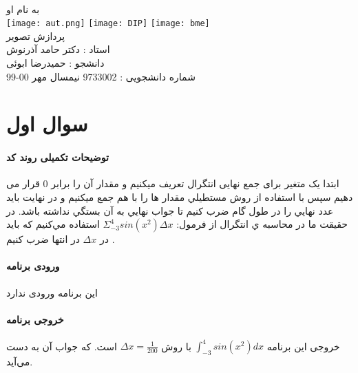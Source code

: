 \documentclass[12pt]{article}
\begin{document}
	\doublespacing
	\begin{titlepage}
		\paragraph*{}
		\centering
			
			
			{\small به نام او}\\
			\vspace{1cm}
			\texttt{[image: aut.png]}
			\hspace{1cm}
			\texttt{[image: DIP]}
			\hspace{1cm}
			\texttt{[image: bme]}\\
			\vspace{2cm}
			{\Huge پردازش تصویر}\\
			\vspace{2cm}
			{\large استاد : دکتر حامد آذرنوش}\\
			\vspace{0.5cm}
			{\small  دانشجو :‌ حمیدرضا ابوئی}\\
			\vspace{0.5cm}
			{\small شماره دانشجویی : 9733002}
			\vfill
			{\tiny نیمسال مهر 00-99}
	\end{titlepage}
	\thispagestyle{plain}
	\tableofcontents
	\newpage
	\doublespacing
	\section{سوال اول}
		\paragraph{توضیحات تکمیلی روند کد}
			ابتدا یک متغیر برای جمع نهایی انتگرال تعریف میکنیم و مقدار آن را برابر $0$ قرار می دهیم سپس با استفاده از روش مستطيلي مقدار ها را با هم جمع ميكنيم و در نهايت بايد عدد نهايي را در طول گام ضرب كنيم تا جواب نهايي به آن بستگي نداشته باشد.
			در حقيقت ما در محاسبه ي انتگرال از فرمول:
			$\Sigma_{-3}^{4} sin(x^2) \Delta x $
			استفاده مي‌کنیم که باید در 
			$\Delta x$ 
			در انتها ضرب کنیم .
			
		\paragraph{ورودی برنامه}
		این برنامه ورودی ندارد
		\paragraph{خروجی برنامه}
	خروجی این برنامه 
	$\int_{-3}^{4} sin(x^2) dx$
	 با روش 
	 $\Delta x = \frac{1}{200}$
است.		
که جواب آن
  به دست می‌آید.
  \newpage
\end{document}
